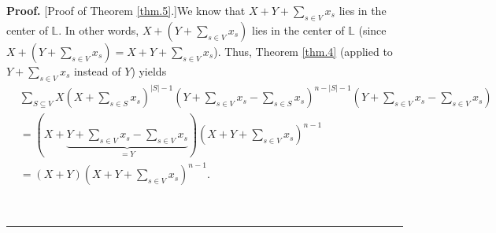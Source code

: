 \documentclass[numbers=enddot,12pt,final,onecolumn,notitlepage]{scrartcl}%
\theoremstyle{definition}
\newenvironment{proof}[1][Proof]{\noindent\textbf{#1.} }{\ \rule{0.5em}{0.5em}}
\let\sumnonlimits\sum
\renewcommand{\sum}{\sumnonlimits\limits}
\newenvironment{verlong}{}{}
\begin{document}
\begin{verlong}
\begin{proof}
[Proof of Theorem \ref{thm.5}.]We know that $X+Y+\sum_{s\in V}x_{s}$ lies in
the center of $\mathbb{L}$. In other words, $X+\left(  Y+\sum_{s\in V}%
x_{s}\right)  $ lies in the center of $\mathbb{L}$ (since $X+\left(
Y+\sum_{s\in V}x_{s}\right)  =X+Y+\sum_{s\in V}x_{s}$). Thus, Theorem
\ref{thm.4} (applied to $Y+\sum_{s\in V}x_{s}$ instead of $Y$) yields%
\begin{align}
&  \sum_{S\subseteq V}X\left(  X+\sum_{s\in S}x_{s}\right)  ^{\left\vert
S\right\vert -1}\left(  Y+\sum_{s\in V}x_{s}-\sum_{s\in S}x_{s}\right)
^{n-\left\vert S\right\vert -1}\left(  Y+\sum_{s\in V}x_{s}-\sum_{s\in V}%
x_{s}\right) \nonumber\\
&  =\left(  X+\underbrace{Y+\sum_{s\in V}x_{s}-\sum_{s\in V}x_{s}}%
_{=Y}\right)  \left(  X+Y+\sum_{s\in V}x_{s}\right)  ^{n-1}\nonumber\\
&  =\left(  X+Y\right)  \left(  X+Y+\sum_{s\in V}x_{s}\right)  ^{n-1}.
\label{pf.thm.5.1}%
\end{align}



\end{proof}
\end{verlong}
\end{document}
